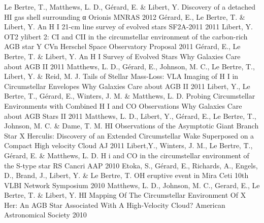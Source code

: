 \begin{cventries}
  \cventry 
    {Le Bertre, T., Matthews, L. D., Gérard, E. \& Libert, Y.}
    {Discovery of a detached HI gas shell surrounding α Orionis}
    {MNRAS}
    {2012} 
    {}
  \cventry 
    {Gérard, E., Le Bertre, T. \& Libert, Y.}
    {An H I 21-cm line survey of evolved stars}
    {SF2A-2011}
    {2011}
    {}
  \cventry 
    {Libert, Y.}
    {OT2 ylibert 2: CI and CII in the circumstellar environment of the carbon-rich AGB star Y CVn}
    {Herschel Space Observatory Proposal}
    {2011}
    {}
  \cventry 
    {Gérard, E., Le Bertre, T. \& Libert, Y.}
    {An H I Survey of Evolved Stars}
    {Why Galaxies Care about AGB II}
    {2011} 
    {}
  \cventry
    {Matthews, L. D., Gérard, E., Johnson, M. C., Le Bertre, T., Libert, Y. \& Reid, M. J. }
    {Tails of Stellar Mass-Loss: VLA Imaging of H I in Circumstellar Envelopes}
    {Why Galaxies Care about AGB II}  
    {2011} 
    {}
  \cventry 
    {Libert, Y., Le Bertre, T., Gérard, E., Winters, J. M. \& Matthews, L. D.}
    {Probing Circumstellar Environments with Combined H I and CO Observations}
    {Why Galaxies Care about AGB Stars II}
    {2011} 
    {}
  \cventry
    {Matthews, L. D., Libert, Y., Gérard, E., Le Bertre, T., Johnson, M. C. \& Dame, T. M.}
    {HI  Observations of the Asymptotic Giant Branch Star X Herculis: Discovery of an Extended Circumstellar Wake Superposed on a Compact High velocity Cloud}
    {AJ}
    {2011}
    {}
  \cventry 
    {Libert,Y., Winters, J. M., Le Bertre, T., Gérard, E. \& Matthews, L. D.}
    {H i and CO in the circumstellar environment of the S-type star RS Cancri}
    {AAP}  
    {2010}
    {}
  \cventry 
    {Etoka, S., Gérard, E., Richards, A., Engels, D., Brand, J., Libert, Y. \& Le Bertre, T.}
    {OH eruptive event in Mira Ceti}
    {10th VLBI Network Symposium}  
    {2010} 
    {}
  \cventry
    {Matthews, L. D., Johnson, M. C., Gerard, E., Le Bertre, T. \& Libert, Y.}
    {HI Mapping Of The Circumstellar Environment Of X Her: An AGB Star Associated With A High-Velocity Cloud?}
    {American Astronomical Society}
    {2010} 
    {}

\end{cventries}
